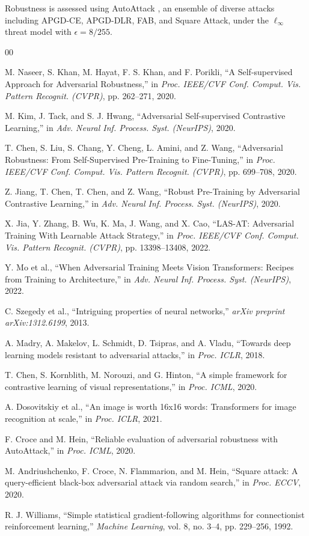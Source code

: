 \documentclass[conference]{IEEEtran}
\begin{document}
Robustness is assessed using AutoAttack \cite{b11}, an ensemble of diverse attacks including APGD-CE, APGD-DLR, FAB, and Square Attack, under the $\ell_\infty$ threat model with $\epsilon = 8/255$.


\begin{thebibliography}{00}

 M. Naseer, S. Khan, M. Hayat, F. S. Khan, and F. Porikli,
``A Self-supervised Approach for Adversarial Robustness,''
in \textit{Proc. IEEE/CVF Conf. Comput. Vis. Pattern Recognit. (CVPR)}, pp. 262--271, 2020.

 M. Kim, J. Tack, and S. J. Hwang,
``Adversarial Self-supervised Contrastive Learning,''
in \textit{Adv. Neural Inf. Process. Syst. (NeurIPS)}, 2020.

 T. Chen, S. Liu, S. Chang, Y. Cheng, L. Amini, and Z. Wang,
``Adversarial Robustness: From Self-Supervised Pre-Training to Fine-Tuning,''
in \textit{Proc. IEEE/CVF Conf. Comput. Vis. Pattern Recognit. (CVPR)}, pp. 699--708, 2020.

 Z. Jiang, T. Chen, T. Chen, and Z. Wang,
``Robust Pre-Training by Adversarial Contrastive Learning,''
in \textit{Adv. Neural Inf. Process. Syst. (NeurIPS)}, 2020.

 X. Jia, Y. Zhang, B. Wu, K. Ma, J. Wang, and X. Cao,
``LAS-AT: Adversarial Training With Learnable Attack Strategy,''
in \textit{Proc. IEEE/CVF Conf. Comput. Vis. Pattern Recognit. (CVPR)}, pp. 13398--13408, 2022.

 Y. Mo et al.,
``When Adversarial Training Meets Vision Transformers: Recipes from Training to Architecture,''
in \textit{Adv. Neural Inf. Process. Syst. (NeurIPS)}, 2022.

 C. Szegedy et al.,
``Intriguing properties of neural networks,''
\textit{arXiv preprint arXiv:1312.6199}, 2013.

 A. Madry, A. Makelov, L. Schmidt, D. Tsipras, and A. Vladu,
``Towards deep learning models resistant to adversarial attacks,''
in \textit{Proc. ICLR}, 2018.

 T. Chen, S. Kornblith, M. Norouzi, and G. Hinton,
``A simple framework for contrastive learning of visual representations,''
in \textit{Proc. ICML}, 2020.

 A. Dosovitskiy et al.,
``An image is worth 16x16 words: Transformers for image recognition at scale,''
in \textit{Proc. ICLR}, 2021.

 F. Croce and M. Hein,
``Reliable evaluation of adversarial robustness with AutoAttack,''
in \textit{Proc. ICML}, 2020.

 M. Andriushchenko, F. Croce, N. Flammarion, and M. Hein,
``Square attack: A query-efficient black-box adversarial attack via random search,''
in \textit{Proc. ECCV}, 2020.

 R. J. Williams,
``Simple statistical gradient-following algorithms for connectionist reinforcement learning,''
\textit{Machine Learning}, vol. 8, no. 3--4, pp. 229--256, 1992.

\end{thebibliography}
\end{document}

